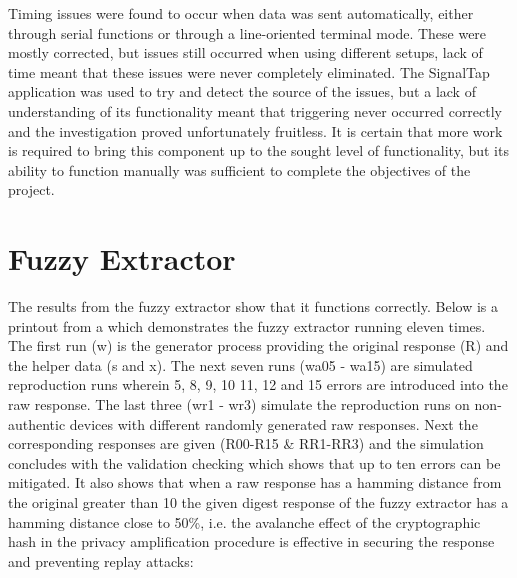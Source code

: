 Timing issues were found to occur when data was sent automatically, either through
\matlab serial functions or through a line-oriented terminal mode. These were
mostly corrected, but issues still occurred when using different setups, lack of time
meant that these issues were never completely eliminated. The SignalTap application
was used to try and detect the source of the issues, but a lack of understanding
of its functionality meant that triggering never occurred correctly and the
investigation proved unfortunately fruitless. It is certain that more work is
required to bring this component up to the sought level of functionality, but
its ability to function manually was sufficient to complete the objectives of the
project.

\section{Fuzzy Extractor}

The results from the fuzzy extractor show that it functions correctly. Below is
a printout from a \matlab which demonstrates the fuzzy extractor running
eleven times. The first run (w) is the generator process providing the original
response (R) and the helper data (s and x). The next seven runs (wa05 - wa15)
are simulated reproduction runs wherein 5, 8, 9, 10 11, 12 and 15 errors are
introduced into the raw response. The last three (wr1 - wr3) simulate the
reproduction runs on non-authentic devices with different randomly generated
raw responses. Next the corresponding responses are given (R00-R15 \& RR1-RR3)
and the simulation concludes with the validation checking which shows that
up to ten errors can be mitigated. It also shows that when a raw response has a
hamming distance from the original greater than 10 the given digest response of
the fuzzy extractor has a hamming distance close to 50\%, i.e. the avalanche
effect of the cryptographic hash in the privacy amplification procedure is
effective in securing the response and preventing replay attacks:

